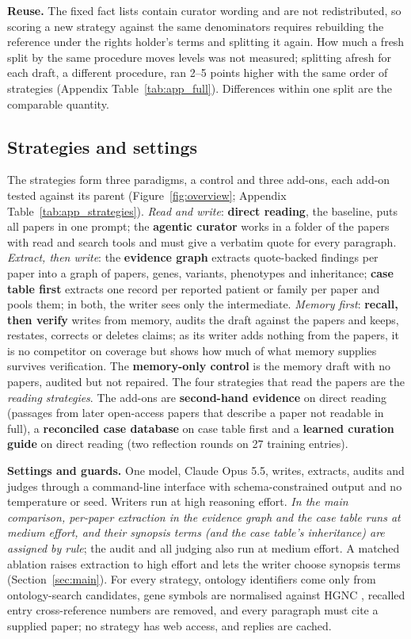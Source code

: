 \documentclass{article} %
\begin{document}
\textbf{Reuse.} The fixed fact lists contain curator wording and are not redistributed, so scoring a new strategy against the same denominators requires rebuilding the reference under the rights holder's terms and splitting it again. How much a fresh split by the same procedure moves levels was not measured; splitting afresh for each draft, a different procedure, ran 2--5 points higher with the same order of strategies (Appendix Table~\ref{tab:app_full}). Differences within one split are the comparable quantity.

\subsection{Strategies and settings}
\label{sec:strategies}
The strategies form three paradigms, a control and three add-ons, each add-on tested against its parent (Figure~\ref{fig:overview}; Appendix Table~\ref{tab:app_strategies}). \emph{Read and write}: \textbf{direct reading}, the baseline, puts all papers in one prompt; the \textbf{agentic curator} works in a folder of the papers with read and search tools and must give a verbatim quote for every paragraph. \emph{Extract, then write}: the \textbf{evidence graph} extracts quote-backed findings per paper into a graph of papers, genes, variants, phenotypes and inheritance; \textbf{case table first} extracts one record per reported patient or family per paper and pools them; in both, the writer sees only the intermediate. \emph{Memory first}: \textbf{recall, then verify} writes from memory, audits the draft against the papers and keeps, restates, corrects or deletes claims; as its writer adds nothing from the papers, it is no competitor on coverage but shows how much of what memory supplies survives verification. The \textbf{memory-only control} is the memory draft with no papers, audited but not repaired. The four strategies that read the papers are the \emph{reading strategies}. The add-ons are \textbf{second-hand evidence} on direct reading (passages from later open-access papers that describe a paper not readable in full), a \textbf{reconciled case database} on case table first and a \textbf{learned curation guide} on direct reading (two reflection rounds on 27 training entries).

\textbf{Settings and guards.} One model, Claude Opus 5.5, writes, extracts, audits and judges through a command-line interface with schema-constrained output and no temperature or seed. Writers run at high reasoning effort. \emph{In the main comparison, per-paper extraction in the evidence graph and the case table runs at medium effort, and their synopsis terms (and the case table's inheritance) are assigned by rule}; the audit and all judging also run at medium effort. A matched ablation raises extraction to high effort and lets the writer choose synopsis terms (Section~\ref{sec:main}). For every strategy, ontology identifiers come only from ontology-search candidates, gene symbols are normalised against HGNC \citep{seal2023genenames}, recalled entry cross-reference numbers are removed, and every paragraph must cite a supplied paper; no strategy has web access, and replies are cached.
\end{document}
